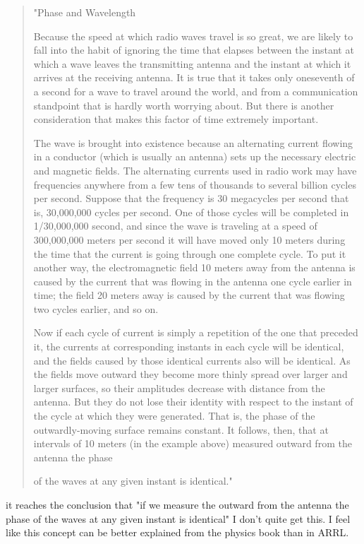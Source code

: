 \documentclass[12pt]{article}
\begin{document}
\begin{quote}
    "Phase and Wavelength

Because the speed at which radio waves travel is so great, we are likely to fall into the habit of ignoring the time that elapses between the instant at which a wave leaves the transmitting antenna and the instant at which it arrives at the receiving antenna. It is true that it takes only oneseventh of a second for a wave to travel around the world, and from a communication standpoint that is hardly worth worrying about. But there is another consideration that makes this factor of time extremely important.

The wave is brought into existence because an alternating current flowing in a conductor (which is usually an antenna) sets up the necessary electric and magnetic fields. The alternating currents used in radio work may have frequencies anywhere from a few tens of thousands to several billion cycles per second. Suppose that the frequency is 30 megacycles per second that is, 30,000,000 cycles per second. One of those cycles will be completed in 1/30,000,000 second, and since the wave is traveling at a speed of 300,000,000 meters per second it will have moved only 10 meters during the time that the current is going through one complete cycle. To put it another way, the electromagnetic field 10 meters away from the antenna is caused by the current that was flowing in the antenna one cycle earlier in time; the field 20 meters away is caused by the current that was flowing two cycles earlier, and
so on.

Now if each cycle of current is simply a repetition of the one that preceded it, the currents at corresponding instants in each cycle will be identical, and the fields caused by those identical currents also will be identical. As the fields move outward they become more thinly spread over larger and larger surfaces, so their amplitudes decrease with distance from the antenna. But they do not lose their identity with respect to the instant of the cycle at which they were generated. That is, the phase of the outwardly-moving surface remains constant. It follows, then, that at intervals of 10 meters (in the example above) measured outward from the antenna the phase

of the waves at any given instant is identical."
\end{quote}
it reaches the conclusion that "if we measure the outward from the antenna the phase of the waves at any given instant is identical" 
I don't quite get this. 
I feel like this concept can be better explained from the physics book than in ARRL.
\end{document}
